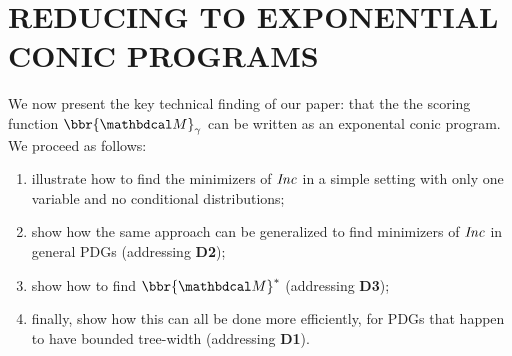 \documentclass[twoside]{article}
\begin{document}
\section{REDUCING TO EXPONENTIAL CONIC PROGRAMS}

    \label{sec:reductions}
We now present the key technical finding of our paper: 
that the
the scoring function $\bbr{\dg M}_\gamma$
can be written as an exponental conic program. 
%
We proceed as follows: 
\begin{enumerate}[itemsep=0pt]
    \item
    illustrate how to find the minimizers of $\mathit{Inc}$ in a simple 
    setting with only one variable and no conditional distributions; 

    \item
    show how the same approach can be generalized to find minimizers 
    of $\mathit{Inc}$ in general PDGs (addressing \textbf{D2}); 
    \item \label{item:+idef}
    show how to find $\bbr{\dg M}^*$ (addressing \textbf{D3});
    \item 
    finally, show how this can all be done
    more efficiently, for PDGs that happen to have
    bounded tree-width (addressing \textbf{D1}).
\end{enumerate}
\end{document}
